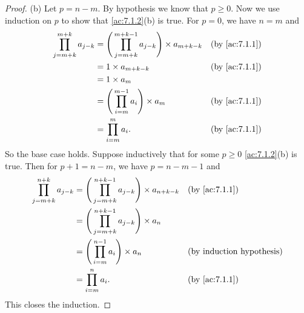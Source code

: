 \begin{proof}{(b)}
  Let \(p = n - m\).
  By hypothesis we know that \(p \geq 0\).
  Now we use induction on \(p\) to show that \cref{ac:7.1.2}(b) is true.
  For \(p = 0\), we have \(n = m\) and
  \begin{align*}
    \prod_{j = m + k}^{m + k} a_{j - k} & = \Bigg(\prod_{j = m + k}^{m + k - 1} a_{j - k}\Bigg) \times a_{m + k - k} &  & \by{ac:7.1.1} \\
                                        & = 1 \times a_{m + k - k}                                                   &  & \by{ac:7.1.1} \\
                                        & = 1 \times a_m                                                                                \\
                                        & = \Bigg(\prod_{i = m}^{m - 1} a_i\Bigg) \times a_m                         &  & \by{ac:7.1.1} \\
                                        & = \prod_{i = m}^m a_i.                                                     &  & \by{ac:7.1.1}
  \end{align*}
  So the base case holds.
  Suppose inductively that for some \(p \geq 0\) \cref{ac:7.1.2}(b) is true.
  Then for \(p + 1 = n - m\), we have \(p = n - m - 1\) and
  \begin{align*}
    \prod_{j = m + k}^{n + k} a_{j - k} & = \Bigg(\prod_{j = m + k}^{n + k - 1} a_{j - k}\Bigg) \times a_{n + k - k} &  & \by{ac:7.1.1} \\
                                        & = \Bigg(\prod_{j = m + k}^{n + k - 1} a_{j - k}\Bigg) \times a_n                              \\
                                        & = \Bigg(\prod_{i = m}^{n - 1} a_i\Bigg) \times a_n                         &  & \byIH         \\
                                        & = \prod_{i = m}^n a_i.                                                     &  & \by{ac:7.1.1}
  \end{align*}
  This closes the induction.
\end{proof}

